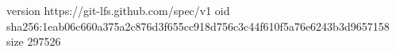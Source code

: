version https://git-lfs.github.com/spec/v1
oid sha256:1eab06c660a375a2c876d3f655cc918d756c3c44f610f5a76e6243b3d9657158
size 297526

